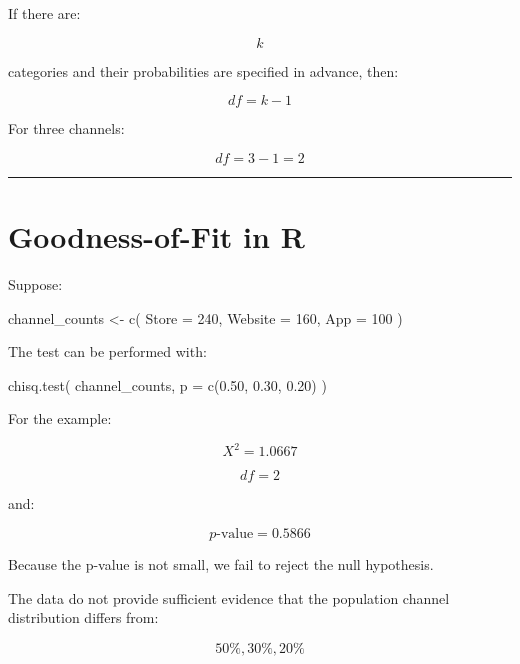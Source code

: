 \documentclass[
  letterpaper,
  DIV=11,
  numbers=noendperiod]{scrreprt}
\newenvironment{Shaded}{\begin{snugshade}}{\end{snugshade}}
\newcommand{\AttributeTok}[1]{\textcolor[rgb]{0.40,0.45,0.13}{#1}}
\newcommand{\DecValTok}[1]{\textcolor[rgb]{0.68,0.00,0.00}{#1}}
\newcommand{\FloatTok}[1]{\textcolor[rgb]{0.68,0.00,0.00}{#1}}
\newcommand{\FunctionTok}[1]{\textcolor[rgb]{0.28,0.35,0.67}{#1}}
\newcommand{\NormalTok}[1]{\textcolor[rgb]{0.00,0.23,0.31}{#1}}
\newcommand{\OtherTok}[1]{\textcolor[rgb]{0.00,0.23,0.31}{#1}}
\begin{document}
If there are:

\[
k
\]

categories and their probabilities are specified in advance, then:

\[
\boxed{
df=k-1
}
\]

For three channels:

\[
df=3-1=2
\]

\begin{center}\rule{0.5\linewidth}{0.5pt}\end{center}


\chapter{Goodness-of-Fit in R}\label{goodness-of-fit-in-r}

Suppose:

\begin{Shaded}
\begin{Highlighting}[]
\NormalTok{channel\_counts }\OtherTok{\textless{}{-}} \FunctionTok{c}\NormalTok{(}
    \AttributeTok{Store =} \DecValTok{240}\NormalTok{,}
    \AttributeTok{Website =} \DecValTok{160}\NormalTok{,}
    \AttributeTok{App =} \DecValTok{100}
\NormalTok{)}
\end{Highlighting}
\end{Shaded}

The test can be performed with:

\begin{Shaded}
\begin{Highlighting}[]
\FunctionTok{chisq.test}\NormalTok{(}
\NormalTok{    channel\_counts,}
    \AttributeTok{p =} \FunctionTok{c}\NormalTok{(}\FloatTok{0.50}\NormalTok{, }\FloatTok{0.30}\NormalTok{, }\FloatTok{0.20}\NormalTok{)}
\NormalTok{)}
\end{Highlighting}
\end{Shaded}

For the example:

\[
X^2=1.0667
\]

\[
df=2
\]

and:

\[
p\text{-value}=0.5866
\]

Because the p-value is not small, we fail to reject the null hypothesis.

The data do not provide sufficient evidence that the population channel
distribution differs from:

\[
50\%,30\%,20\%
\]
\end{document}
